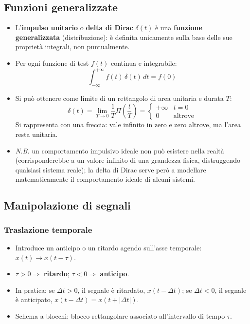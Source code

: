 \documentclass[12pt, a4paper]{article}
\begin{document}
\subsection{Funzioni generalizzate}
\begin{itemize}
    \item L'\textbf{impulso unitario} o \textbf{delta di Dirac} $\delta(t)$ è una \textbf{funzione generalizzata} (distribuzione): è definita unicamente sulla base delle sue proprietà integrali, non puntualmente.
    \item Per ogni funzione di test $f(t)$ continua e integrabile:
    $$\int_{-\infty}^{+\infty} f(t)\,\delta(t)\,dt = f(0)$$
    \item Si può ottenere come limite di un rettangolo di area unitaria e durata $T$:
    $$\delta(t) = \lim_{T\to0} \frac1T \Pi\left(\frac tT\right) = \begin{cases} +\infty & t=0 \\ 0 & \text{altrove}\end{cases}$$
    Si rappresenta con una freccia: vale infinito in zero e zero altrove, ma l'area resta unitaria.
    \item \textit{N.B.} un comportamento impulsivo ideale non può esistere nella realtà (corrisponderebbe a un valore infinito di una grandezza fisica, distruggendo qualsiasi sistema reale); la delta di Dirac serve però a modellare matematicamente il comportamento ideale di alcuni sistemi.
\end{itemize}

\subsection{Manipolazione di segnali}

\subsubsection{Traslazione temporale}
\begin{itemize}
    \item Introduce un anticipo o un ritardo agendo sull'asse temporale: $x(t) \to x(t-\tau)$.
    \item $\tau > 0 \Rightarrow$ \textbf{ritardo}; $\tau < 0 \Rightarrow$ \textbf{anticipo}.
    \item In pratica: se $\Delta t>0$, il segnale è ritardato, $x(t-\Delta t)$; se $\Delta t<0$, il segnale è anticipato, $x(t-\Delta t) = x(t+|\Delta t|)$.
    \item Schema a blocchi: blocco rettangolare associato all'intervallo di tempo $\tau$.
\end{itemize}
\end{document}

